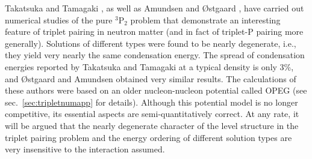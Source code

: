 Takatsuka and Tamagaki \cite{tt71,ttr}, as well as Amundsen and
{\O}stgaard \cite {ostgaard}, have carried out numerical studies
of the pure $^3$P$_2$ problem that demonstrate an interesting
feature of triplet pairing in neutron matter (and in fact
of triplet-P pairing more generally).  Solutions of different types
were found to be nearly degenerate, i.e., they yield very nearly
the same condensation energy.  The spread of condensation energies
reported by Takatsuka and Tamagaki at a typical density is only 3\%,
and {\O}stgaard and Amundsen obtained very similar results.  The
calculations of these authors were based on an older nucleon-nucleon
potential called OPEG (see sec.~\ref{sec:tripletnumapp} for details).
Although this potential model is no longer competitive, its essential
aspects are semi-quantitatively correct.  At any rate,
it will be argued that the nearly degenerate character of the level
structure in the triplet pairing problem and the energy ordering
of different solution types are very insensitive to the interaction
assumed.


